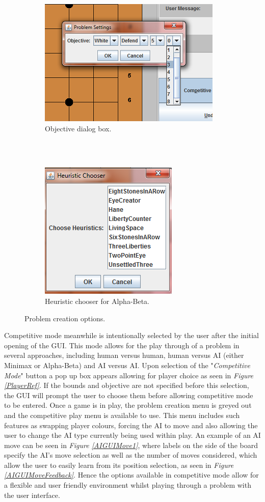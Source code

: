 \documentclass{l3proj}
\begin{document}
\begin{figure}[H]
\begin{subfigure}[H]{0.2\textwidth}
\includegraphics[scale=1]{Images/GUI-7-Objective.png}
\caption{Objective dialog box.}
\label{ObjPic}
\end{subfigure}
~~~~~~~~~~~~~~~~~~~~~~~~~~~~~~~~~~~~~~~~~~~~~~~~~~~~~~~~~~~~~~~~
\begin{subfigure}[H]{0.3\textwidth}
\includegraphics[scale=1]{Images/GUI-Heuristics.png}
\caption{Heuristic chooser for Alpha-Beta.}
\label{HeuristicsGUI}
\end{subfigure}
\caption{Problem creation options.}
\end{figure}

Competitive mode meanwhile is intentionally selected by the user after the initial opening of the GUI. This mode allows for the play through of a problem in several approaches, including human versus human, human versus AI (either Minimax or Alpha-Beta) and AI versus AI. Upon selection of the "\textit{Competitive Mode}" button a pop up box appears allowing for player choice as seen in \textit{Figure \ref{PlayerRef}}. If the bounds and objective are not specified before this selection, the GUI will prompt the user to choose them before allowing competitive mode to be entered. Once a game is in play, the problem creation menu is greyed out and the competitive play menu is available to use. This menu includes such features as swapping player colours, forcing the AI to move and also allowing the user to change the AI type currently being used within play. An example of an AI move can be seen in \textit{Figure \ref{AIGUIMove1}}, where labels on the side of the board specify the AI's move selection as well as the number of moves considered, which allow the user to easily learn from its position selection, as seen in \textit{Figure \ref{AIGUIMoveFeedback}}. Hence the options available in competitive mode allow for a flexible and user friendly environment whilst playing through a problem with the user interface.
\end{document}
